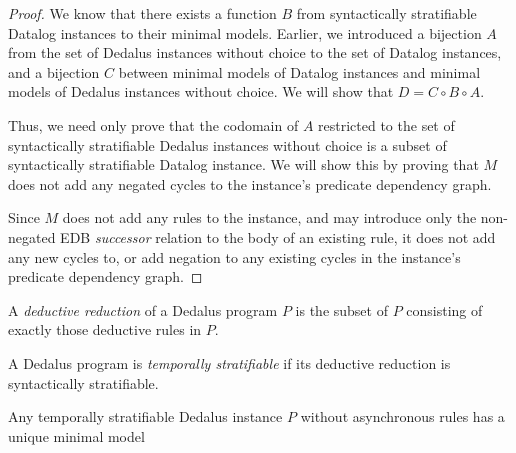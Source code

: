 \begin{proof}
%
We know that there exists a function $B$ from syntactically stratifiable
Datalog instances to their minimal models.  Earlier, we introduced  a bijection  $A$ from the set of
Dedalus instances without choice to the set of Datalog instances, and a
bijection $C$ between minimal models of Datalog instances and minimal models of
Dedalus instances without choice.  We will show that $D = C \circ B \circ A$.

Thus, we need only prove that the codomain of $A$ restricted to the set of
syntactically stratifiable Dedalus instances without choice is a subset of
syntactically stratifiable Datalog instance.  We will show this by proving that
$M$ does not add any negated cycles to the instance's predicate dependency
graph.

Since $M$ does not add any rules to the instance, and may introduce only the
non-negated EDB {\em successor} relation to the body of an existing rule, it
does not add any new cycles to, or add negation to any existing cycles in the
instance's predicate dependency graph.
%
\end{proof}

\begin{definition}
%
%
\end{definition}

%
%

%
%


\begin{definition}
%
A \emph{deductive reduction} of a Dedalus program $P$ is the subset of $P$
consisting of exactly those deductive rules in $P$.
%
\end{definition}

\begin{definition} 
%
A Dedalus program is \emph{temporally stratifiable} if its deductive
reduction is syntactically stratifiable.
%
\end{definition}

\begin{lemma}
%
Any temporally stratifiable Dedalus instance $P$ without asynchronous rules has
a unique minimal model
%
\end{lemma} 

